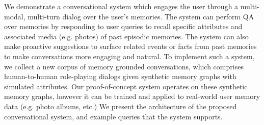 We demonstrate a conversational system which engages the user through a multi-modal, multi-turn dialog over the user's memories. The system can perform QA over memories by responding to user queries to recall specific attributes and associated media (e.g. photos) of past episodic memories. The system can also make proactive suggestions to surface related events or facts from past memories to make conversations more engaging and natural.
To implement such a system, we collect a new corpus of memory grounded conversations, which comprises human-to-human role-playing dialogs given synthetic memory graphs with simulated attributes. Our proof-of-concept system operates on these synthetic memory graphs, however it can be trained and applied to real-world user memory data (e.g. photo albums, etc.) We present the architecture of the proposed conversational system, and example queries that the system supports.